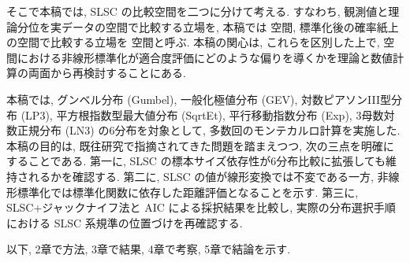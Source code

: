 そこで本稿では, SLSC の比較空間を二つに分けて考える.
すなわち, 観測値と理論分位を実データの空間で比較する立場を, 本稿では \Xsp 空間, 標準化後の確率紙上の空間で比較する立場を \Ssp 空間と呼ぶ.
本稿の関心は, これらを区別した上で, \Ssp 空間における非線形標準化が適合度評価にどのような偏りを導くかを理論と数値計算の両面から再検討することにある.

本稿では, グンベル分布 (Gumbel), 一般化極値分布 (GEV), 対数ピアソンIII型分布 (LP3), 平方根指数型最大値分布 (SqrtEt), 平行移動指数分布 (Exp), 3母数対数正規分布 (LN3) の6分布を対象として, 多数回のモンテカルロ計算を実施した.
本稿の目的は, 既往研究で指摘されてきた問題を踏まえつつ, 次の三点を明確にすることである.
第一に, SLSC の標本サイズ依存性が6分布比較に拡張しても維持されるかを確認する.
第二に, SLSC の値が線形変換では不変である一方, 非線形標準化では標準化関数に依存した距離評価となることを示す.
第三に, SLSC+ジャックナイフ法と AIC による採択結果を比較し, 実際の分布選択手順における SLSC 系規準の位置づけを再確認する.

以下, 2章で方法, 3章で結果, 4章で考察, 5章で結論を示す.

